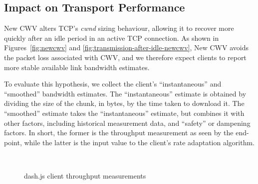 \documentclass[10pt,sigconf]{acmart}
\begin{document}
\subsection{Impact on Transport Performance} 
\label{sec:transport-impact}

New CWV alters TCP's \emph{cwnd} sizing behaviour, allowing it to recover more quickly after an idle period in an active TCP connection. As shown in Figures~\ref{fig:newcwv} and \ref{fig:transmission-after-idle-newcwv}, New CWV avoids the packet loss associated with CWV, and we therefore expect clients to report more stable available link bandwidth estimates. 

To evaluate this hypothesis, we collect the client's ``instantaneous'' and ``smoothed'' bandwidth estimates. The ``instantaneous'' estimate is obtained by dividing the size of the chunk, in bytes, by the time taken to download it. The ``smoothed'' estimate takes the ``instantaneous'' estimate, but combines it with other factors, including historical measurement data, and ``safety'' or dampening factors. In short, the former is the throughput measurement as seen by the end-point, while the latter is the input value to the client's rate adaptation algorithm.

\begin{figure}[t!]
  \centering
  \\
  \caption{dash.js client throughput measurements}
  \label{fig:throughput-clients}
\end{figure}
\end{document}
